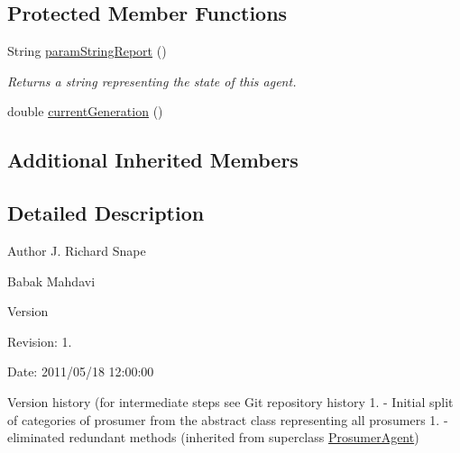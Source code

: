 \subsection*{Protected Member Functions}
\begin{DoxyCompactItemize}
\item 
String \hyperlink{classuk_1_1ac_1_1dmu_1_1iesd_1_1cascade_1_1agents_1_1prosumers_1_1_wind_generator_prosumer_a7699790411743d30ac3335fb10fc532a}{param\-String\-Report} ()
\begin{DoxyCompactList}\small\item\em Returns a string representing the state of this agent. \end{DoxyCompactList}\item 
double \hyperlink{classuk_1_1ac_1_1dmu_1_1iesd_1_1cascade_1_1agents_1_1prosumers_1_1_wind_generator_prosumer_a4d9a182bdae436b445e926aab138d408}{current\-Generation} ()
\end{DoxyCompactItemize}
\subsection*{Additional Inherited Members}


\subsection{Detailed Description}
\begin{DoxyAuthor}{Author}
J. Richard Snape 

Babak Mahdavi 
\end{DoxyAuthor}
\begin{DoxyVersion}{Version}

\end{DoxyVersion}
\begin{DoxyParagraph}{Revision\-:}
1. 
\end{DoxyParagraph}
\begin{DoxyParagraph}{Date\-:}
2011/05/18 12\-:00\-:00 
\end{DoxyParagraph}


Version history (for intermediate steps see Git repository history 1. -\/ Initial split of categories of prosumer from the abstract class representing all prosumers 1. -\/ eliminated redundant methods (inherited from superclass \hyperlink{classuk_1_1ac_1_1dmu_1_1iesd_1_1cascade_1_1agents_1_1prosumers_1_1_prosumer_agent}{Prosumer\-Agent}) 

